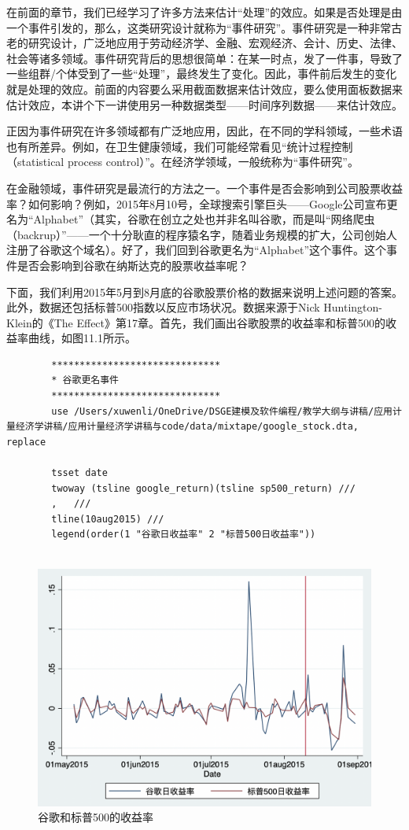 \documentclass[cn,12pt,math=newtx,citestyle=gb7714-2015,bibstyle=gb7714-2015]{elegantbook}
\begin{document}
	在前面的章节，我们已经学习了许多方法来估计“处理”的效应。如果是否处理是由一个事件引发的，那么，这类研究设计就称为“事件研究”。事件研究是一种非常古老的研究设计，广泛地应用于劳动经济学、金融、宏观经济、会计、历史、法律、社会等诸多领域。事件研究背后的思想很简单：在某一时点，发了一件事，导致了一些组群/个体受到了一些“处理”，最终发生了变化。因此，事件前后发生的变化就是处理的效应。前面的内容要么采用截面数据来估计效应，要么使用面板数据来估计效应，本讲个下一讲使用另一种数据类型——时间序列数据——来估计效应。
	
	正因为事件研究在许多领域都有广泛地应用，因此，在不同的学科领域，一些术语也有所差异。例如，在卫生健康领域，我们可能经常看见“统计过程控制（statistical process control）”。在经济学领域，一般统称为“事件研究”。
	
	在金融领域，事件研究是最流行的方法之一。一个事件是否会影响到公司股票收益率？如何影响？例如，2015年8月10号，全球搜索引擎巨头——Google公司宣布更名为“Alphabet”（其实，谷歌在创立之处也并非名叫谷歌，而是叫“网络爬虫（backrup）”——一个十分耿直的程序猿名字，随着业务规模的扩大，公司创始人注册了谷歌这个域名）。好了，我们回到谷歌更名为“Alphabet”这个事件。这个事件是否会影响到谷歌在纳斯达克的股票收益率呢？
	
	下面，我们利用2015年5月到8月底的谷歌股票价格的数据来说明上述问题的答案。此外，数据还包括标普500指数以反应市场状况。数据来源于Nick Huntington-Klein的《The Effect》第17章。首先，我们画出谷歌股票的收益率和标普500的收益率曲线，如图11.1所示。
	
	\begin{lstlisting}
		******************************
		* 谷歌更名事件
		******************************
		use /Users/xuwenli/OneDrive/DSGE建模及软件编程/教学大纲与讲稿/应用计量经济学讲稿/应用计量经济学讲稿与code/data/mixtape/google_stock.dta, replace
		
		tsset date
		twoway (tsline google_return)(tsline sp500_return) ///
		,	///
		tline(10aug2015) ///
		legend(order(1 "谷歌日收益率" 2 "标普500日收益率"))
		
	\end{lstlisting}
	
	\begin{figure}[tbph]
		\centering
		\includegraphics[width=1\linewidth]{google}
		\caption{谷歌和标普500的收益率}
		\label{fig:google}
	\end{figure}
	
\end{document}
